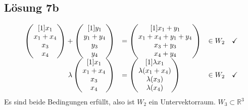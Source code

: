 \documentclass[main.tex]{subfiles}
\begin{document}
\subsection{Lösung 7b}
\begin{equation*}
    \begin{array}{ r l l c }
    \begin{pmatrix}[1]
    x_{1}\\
    x_{1} +x_{4}\\
    x_{3}\\
    x_{4}
    \end{pmatrix} +\begin{pmatrix}[1]
    y_{1}\\
    y_{1} +y_{4}\\
    y_{3}\\
    y_{4}
    \end{pmatrix} & =\begin{pmatrix}[1]
    x_{1} +y_{1}\\
    x_{1} +x_{4} +y_{1} +y_{4}\\
    x_{3} +y_{3}\\
    x_{4} +y_{4}
    \end{pmatrix} & \in W_{2} & \checkmark \\
    \lambda \begin{pmatrix}[1]
    x_{1}\\
    x_{1} +x_{4}\\
    x_{3}\\
    x_{4}
    \end{pmatrix} & =\begin{pmatrix}[1]
    \lambda x_{1}\\
    \lambda ( x_{1} +x_{4})\\
    \lambda ( x_{3})\\
    \lambda ( x_{4})
    \end{pmatrix} & \in W_{2} & \checkmark 
    \end{array}
\end{equation*}
Es sind beide Bedingungen erfüllt, also ist $W_{2}$ ein Untervektorraum. $W_{3} \subset \mathbb{R}^{3}$ 
\end{document}
